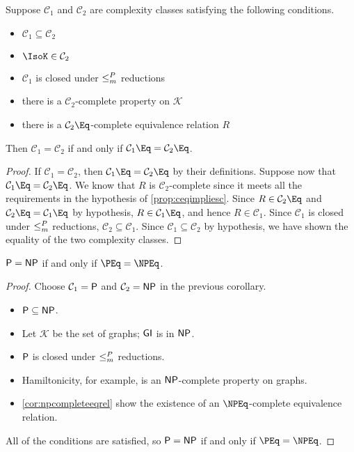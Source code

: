 \begin{proposition}
  Suppose $\mathcal{C}_1$ and $\mathcal{C}_2$ are complexity classes satisfying the following conditions.
  \begin{itemize}
  \item $\mathcal{C}_1 \subseteq \mathcal{C}_2$
  \item $\IsoK \in \mathcal{C}_2$
  \item $\mathcal{C}_1$ is closed under $\mor$ reductions
  \item there is a $\mathcal{C}_2$-complete property on $\mathcal{K}$
  \item there is a $\mathcal{C}_2\Eq$-complete equivalence relation $R$
  \end{itemize}
  Then $\mathcal{C}_1 = \mathcal{C}_2$ if and only if $\mathcal{C}_1\Eq = \mathcal{C}_2\Eq$.
\end{proposition}
\begin{proof}
  If $\mathcal{C}_1 = \mathcal{C}_2$, then $\mathcal{C}_1\Eq = \mathcal{C}_2\Eq$ by their definitions.
  Suppose now that $\mathcal{C}_1\Eq = \mathcal{C}_2\Eq$.
  We know that $R$ is $\mathcal{C}_2$-complete since it meets all the requirements in the hypothesis of \autoref{prop:ceqimpliesc}.
  Since $R \in \mathcal{C}_2\Eq$ and $\mathcal{C}_2\Eq = \mathcal{C}_1\Eq$ by hypothesis, $R \in \mathcal{C}_1\Eq$, and hence $R \in \mathcal{C}_1$.
  Since $\mathcal{C}_1$ is closed under $\mor$ reductions, $\mathcal{C}_2 \subseteq \mathcal{C}_1$.
  Since $\mathcal{C}_1 \subseteq \mathcal{C}_2$ by hypothesis, we have shown the equality of the two complexity classes.
\end{proof}

\begin{corollary}
  $\P = \NP$ if and only if $\PEq = \NPEq$.
\end{corollary}
\begin{proof}
  Choose $\mathcal{C}_1 = \P$ and $\mathcal{C}_2 = \NP$ in the previous corollary.
  \begin{itemize}
  \item $\P \subseteq \NP$.
  \item Let $\mathcal{K}$ be the set of graphs; $\GI$ is in $\NP$.
  \item $\P$ is closed under $\mor$ reductions.
  \item Hamiltonicity, for example, is an $\NP$-complete property on graphs.
  \item \autoref{cor:npcompleteeqrel} show the existence of an $\NPEq$-complete equivalence relation.
  \end{itemize}
  All of the conditions are satisfied, so $\P = \NP$ if and only if $\PEq = \NPEq$.
\end{proof}


